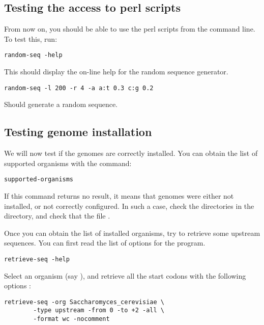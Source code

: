 \documentclass{article}
\begin{document}
\subsection{Testing the access to perl scripts}

From now on, you should be able to use the perl scripts from the
command line. To test this, run: 

\begin{verbatim}
random-seq -help
\end{verbatim}

This should display the on-line help for the random sequence
generator. 

\begin{verbatim}
random-seq -l 200 -r 4 -a a:t 0.3 c:g 0.2
\end{verbatim}

Should generate a random sequence.

\subsection{Testing genome installation}

We will now test if the genomes are correctly installed. You can
obtain the list of supported organisms with the command:

\begin{verbatim}
supported-organisms
\end{verbatim}

If this command returns no result, it means that genomes were either
not installed, or not correctly configured. In such a case, check the
directories in the  directory, and check that the
file .

Once you can obtain the list of installed organisms, try to retrieve
some upstream sequences. You can first read the list of options for the
 program.

\begin{verbatim}
retrieve-seq -help
\end{verbatim}

Select an organism (say ), and
retrieve all the start codons with the following options :

\begin{verbatim}
retrieve-seq -org Saccharomyces_cerevisiae \
        -type upstream -from 0 -to +2 -all \
        -format wc -nocomment 
\end{verbatim}
\end{document}
